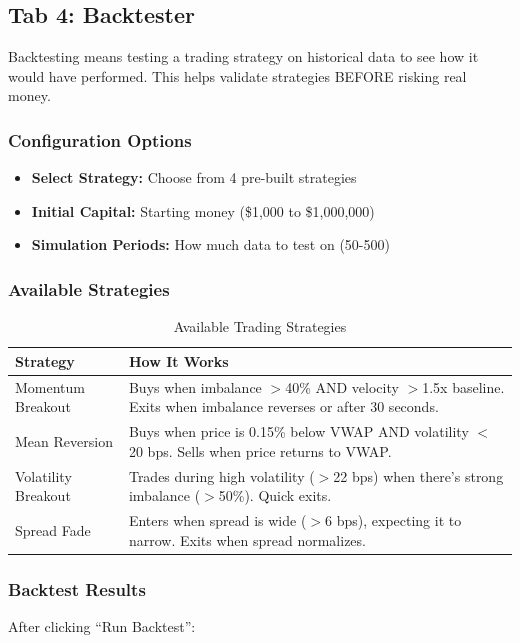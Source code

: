 \documentclass[12pt,a4paper]{article}
\begin{document}
\subsection{Tab 4: Backtester}

\begin{importantbox}
Backtesting means testing a trading strategy on historical data to see how it would have performed. This helps validate strategies BEFORE risking real money.
\end{importantbox}

\subsubsection{Configuration Options}
\begin{itemize}
    \item \textbf{Select Strategy:} Choose from 4 pre-built strategies
    \item \textbf{Initial Capital:} Starting money (\$1,000 to \$1,000,000)
    \item \textbf{Simulation Periods:} How much data to test on (50-500)
\end{itemize}

\subsubsection{Available Strategies}

\begin{table}[h]
\centering
\begin{tabular}{lp{9cm}}
\toprule
\textbf{Strategy} & \textbf{How It Works} \\
\midrule
Momentum Breakout & Buys when imbalance $>$40\% AND velocity $>$1.5x baseline. Exits when imbalance reverses or after 30 seconds. \\
Mean Reversion & Buys when price is 0.15\% below VWAP AND volatility $<$20 bps. Sells when price returns to VWAP. \\
Volatility Breakout & Trades during high volatility ($>$22 bps) when there's strong imbalance ($>$50\%). Quick exits. \\
Spread Fade & Enters when spread is wide ($>$6 bps), expecting it to narrow. Exits when spread normalizes. \\
\bottomrule
\end{tabular}
\caption{Available Trading Strategies}
\end{table}

\subsubsection{Backtest Results}
After clicking ``Run Backtest'':
\end{document}
